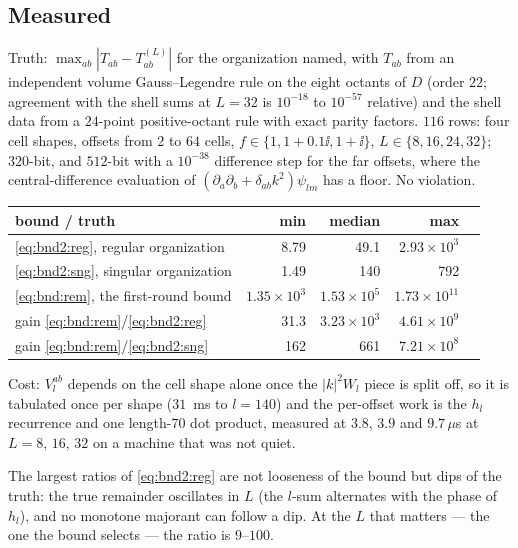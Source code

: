 \subsection{Measured}
\label{sec:bnd2:meas}

Truth: $\max_{ab}|T_{ab}-T^{(L)}_{ab}|$ for the organization named, with $T_{ab}$ from an
independent  volume Gauss--Legendre rule on the eight octants of $D$
(order $22$; agreement with the shell sums at $L = 32$ is $10^{-18}$ to $10^{-57}$
relative) and the shell data from a $24$-point positive-octant rule with exact parity
factors. $116$ rows: four cell shapes, offsets from $2$ to $64$ cells,
$f \in \{1, 1+0.1\ii, 1+\ii\}$, $L \in \{8,16,24,32\}$; $320$-bit, and $512$-bit with a
$10^{-38}$ difference step for the far offsets, where the central-difference evaluation of
$(\partial_a\partial_b+\delta_{ab}k^2)\psi_{lm}$ has a floor. No violation.

\begin{center}\footnotesize
\begin{tabular}{@{}lrrrr@{}}
\toprule
bound / truth & min & median & max \\
\midrule
\eqref{eq:bnd2:reg}, regular organization & 8.79 & 49.1 & $2.93\times10^{3}$\\
\eqref{eq:bnd2:sng}, singular organization & 1.49 & 140 & 792\\
\eqref{eq:bnd:rem}, the first-round bound & $1.35\times10^{3}$ & $1.53\times10^{5}$ &
$1.73\times10^{11}$\\
\midrule
gain \eqref{eq:bnd:rem}/\eqref{eq:bnd2:reg} & 31.3 & $3.23\times10^{3}$ &
$4.61\times10^{9}$\\
gain \eqref{eq:bnd:rem}/\eqref{eq:bnd2:sng} & 162 & 661 & $7.21\times10^{8}$\\
\bottomrule
\end{tabular}
\end{center}

\noindent
Cost: $V^{ab}_l$ depends on the cell shape alone once the $|k|^2W_l$ piece is split off, so it
is tabulated once per shape ($31$~ms to $l = 140$) and the per-offset work is the $h_l$
recurrence and one length-$70$ dot product, measured at $3.8$, $3.9$ and $9.7\,\mu$s at
$L = 8$, $16$, $32$ on a machine that was not quiet.

\noindent
The largest ratios of \eqref{eq:bnd2:reg} are not looseness of the bound but dips of the
truth: the true remainder oscillates in $L$ (the $l$-sum alternates with the phase of
$h_l$), and no monotone majorant can follow a dip. At the $L$ that matters --- the one the
bound selects --- the ratio is $9$--$100$.

